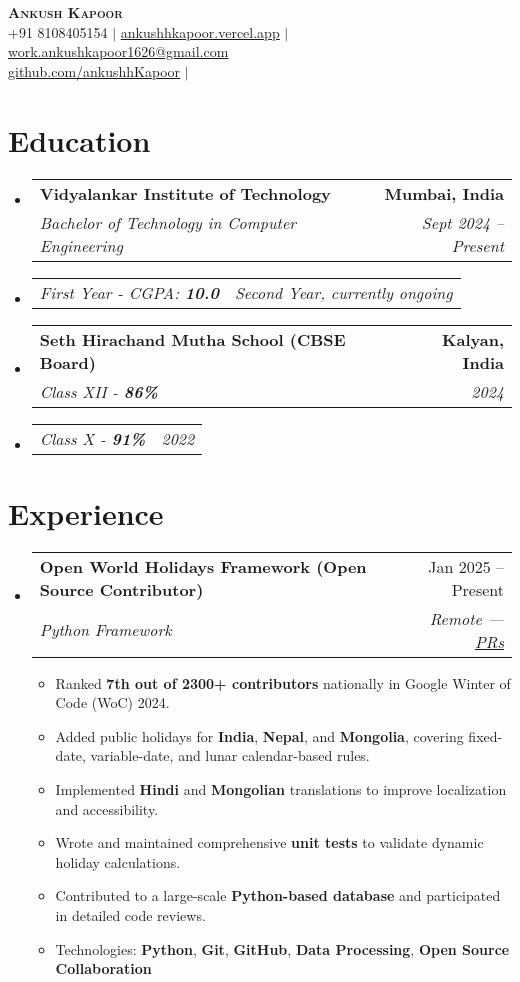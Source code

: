 \documentclass[letterpaper,11pt]{article}
\makeatletter
\newcommand{\resumeItem}[1]{
  \item\small{#1 \vspace{-2pt}}
}
\newcommand{\resumeSubheading}[4]{
  \vspace{-2pt}\item
    \begin{tabular*}{0.97\textwidth}[t]{l@{\extracolsep{\fill}}r}
      \textbf{#1} & #2 \\
      \textit{\small#3} & \textit{\small #4} \\
    \end{tabular*}\vspace{-7pt}
}
\newcommand{\resumeSubSubheading}[2]{
    \item
    \begin{tabular*}{0.97\textwidth}{l@{\extracolsep{\fill}}r}
      \textit{\small#1} & \textit{\small #2} \\
    \end{tabular*}\vspace{-5pt}
}
\newcommand{\resumeSubHeadingListStart}{\begin{itemize}[leftmargin=0.15in, label={}]}
\newcommand{\resumeSubHeadingListEnd}{\end{itemize}}
\newcommand{\resumeItemListStart}{\begin{itemize}}
\newcommand{\resumeItemListEnd}{\end{itemize}\vspace{-5pt}}
\makeatother
\begin{document}
\begin{center}
    \textbf{\Huge \scshape Ankush Kapoor} \\ \vspace{1pt}
    \small +91 8108405154 $|$  \href{https://ankushhkapoor.vercel.app}{\underline{ankushhkapoor.vercel.app}} $|$
    \href{mailto:work.ankushkapoor1626@gmail.com}{\underline{work.ankushkapoor1626@gmail.com}} \\
    \href{https://github.com/ankushhKapoor}{\underline{github.com/ankushhKapoor}} $|$
\end{center}

\section{Education}
  \resumeSubHeadingListStart
    \resumeSubheading
      {Vidyalankar Institute of Technology}{\textbf{Mumbai, India}}
      {Bachelor of Technology in Computer Engineering}{Sept 2024 -- Present}
    \resumeSubSubheading
      {First Year - CGPA: \textbf{10.0}}{Second Year, currently ongoing}

    \resumeSubheading
      {Seth Hirachand Mutha School (CBSE Board)}{\textbf{Kalyan, India}}
      {Class XII - \textbf{86\%}}{2024}
    \resumeSubSubheading
      {Class X - \textbf{91\%}}{2022}
  \resumeSubHeadingListEnd

\section{Experience}
  \resumeSubHeadingListStart
    \resumeSubheading
      {Open World Holidays Framework (Open Source Contributor)}{Jan 2025 -- Present}
      {Python Framework}{Remote — \href{https://github.com/vacanza/holidays/pulls/ankushhKapoor}{\underline{PRs}}}
      \resumeItemListStart
        \resumeItem{Ranked \textbf{7th out of 2300+ contributors} nationally in Google Winter of Code (WoC) 2024.}
        \resumeItem{Added public holidays for \textbf{India}, \textbf{Nepal}, and \textbf{Mongolia}, covering fixed-date, variable-date, and lunar calendar-based rules.}
        \resumeItem{Implemented \textbf{Hindi} and \textbf{Mongolian} translations to improve localization and accessibility.}
        \resumeItem{Wrote and maintained comprehensive \textbf{unit tests} to validate dynamic holiday calculations.}
        \resumeItem{Contributed to a large-scale \textbf{Python-based database} and participated in detailed code reviews.}
        \resumeItem{Technologies: \textbf{Python}, \textbf{Git}, \textbf{GitHub}, \textbf{Data Processing}, \textbf{Open Source Collaboration}}
      \resumeItemListEnd
  \resumeSubHeadingListEnd
\end{document}
